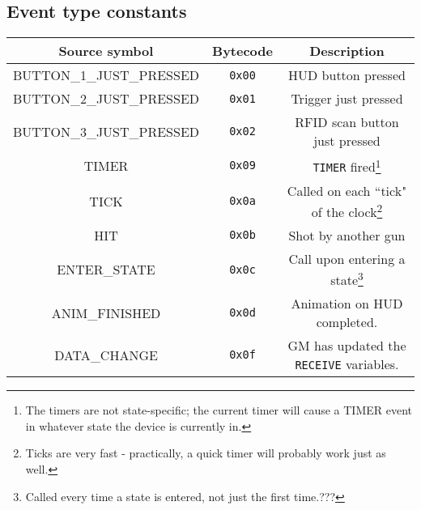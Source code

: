 \documentclass[12pt,a4paper]{scrbook}
\begin{document}
\subsection{Event type constants}
\label{sec:eventtypeconsts}
\begin{minipage}{\linewidth}
\begin{center}
  \begin{tabular}{ | c | c || c | }
    \hline
    Source symbol & Bytecode & Description \\ \hline \hline
    BUTTON\_1\_JUST\_PRESSED	& \texttt{0x00} & HUD button pressed  \\ \hline
    BUTTON\_2\_JUST\_PRESSED 	& \texttt{0x01} & Trigger just pressed  \\ \hline
    BUTTON\_3\_JUST\_PRESSED 	& \texttt{0x02} & RFID scan button just pressed  \\ \hline
    TIMER					 	& \texttt{0x09} & \texttt{TIMER} fired\footnote{
    					The timers are not state-specific; the current timer will cause a TIMER event
    					in whatever state the device is currently in.}  \\ \hline
    TICK					 	& \texttt{0x0a} & Called on each ``tick" of the clock\footnote{ 
    					Ticks are very fast - practically, a quick timer will probably work just 
    					as well.}  \\ \hline
    HIT						 	& \texttt{0x0b} & Shot by another gun  \\ \hline
    ENTER\_STATE			 	& \texttt{0x0c} & Call upon entering a state\footnote{ 
    					Called every time a state is entered, not just the first time.???} \\ \hline
    ANIM\_FINISHED			 	& \texttt{0x0d} & Animation on HUD completed.  \\ \hline
    DATA\_CHANGE 				& \texttt{0x0f} & GM has updated the \texttt{RECEIVE} variables.  
    					\\ \hline
  \end{tabular}
\end{center}
\end{minipage}

\end{document}
